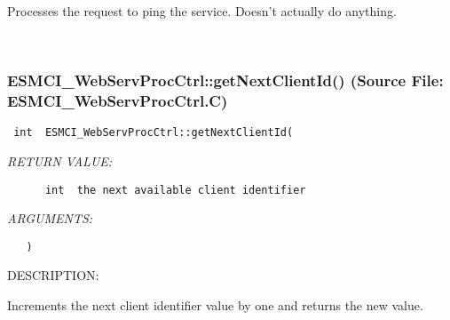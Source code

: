       Processes the request to ping the service.  Doesn't actually do anything.
   
 
\mbox{}\hrulefill\
 
\subsubsection{ESMCI\_WebServProcCtrl::getNextClientId() (Source File: ESMCI\_WebServProcCtrl.C)}


  
\begin{verbatim} int  ESMCI_WebServProcCtrl::getNextClientId(\end{verbatim}{\em RETURN VALUE:}
\begin{verbatim}      int  the next available client identifier\end{verbatim}{\em ARGUMENTS:}
\begin{verbatim}   )\end{verbatim}
{\sf DESCRIPTION:\\ }


      Increments the next client identifier value by one and returns the
      new value.
  
\setlength{\parskip}{\oldparskip}
\setlength{\parindent}{\oldparindent}
\setlength{\baselineskip}{\oldbaselineskip}

